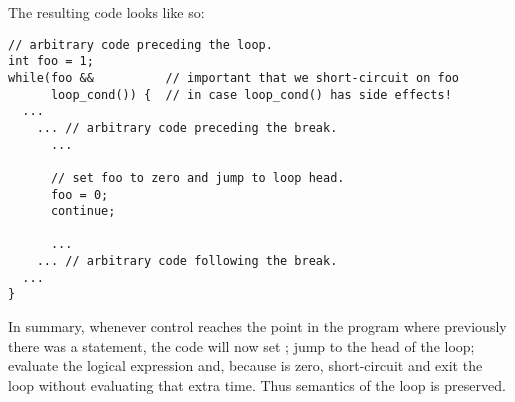 \newpage
\noindent The resulting code looks like so:

\begin{verbatim}
// arbitrary code preceding the loop.
int foo = 1;
while(foo &&          // important that we short-circuit on foo
      loop_cond()) {  // in case loop_cond() has side effects!
  ...
    ... // arbitrary code preceding the break.
      ...

      // set foo to zero and jump to loop head.
      foo = 0;
      continue;

      ...
    ... // arbitrary code following the break.
  ...
}
\end{verbatim}

In summary, whenever control reaches the point in the program where previously
there was a  statement, the code will now set ; jump to
the head of the loop; evaluate the logical  expression and, because
 is zero, short-circuit and exit the loop without evaluating
 that extra time. Thus semantics of the loop is preserved.

\Sectend
